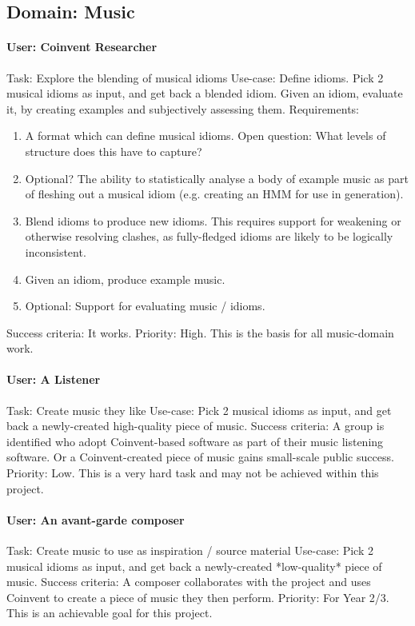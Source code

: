\documentclass[a4paper,twoside,11pt]{article}
\begin{document}
\begin{appendices}
\subsection{Domain: Music}

\paragraph{User: Coinvent Researcher}
Task: Explore the blending of musical idioms      
Use-case: Define idioms. Pick 2 musical idioms as input, and get back a blended idiom. Given an idiom, evaluate it, by creating examples and subjectively assessing them.   
Requirements: 
\begin{enumerate}
\item A format which can define musical idioms. Open question: What levels of structure does this have to capture?
\item Optional? The ability to statistically analyse a body of example music as part of fleshing out a musical idiom (e.g. creating an HMM for use in generation).
\item Blend idioms to produce new idioms. This requires support for weakening or otherwise resolving clashes, as fully-fledged idioms are likely to be logically inconsistent.
\item Given an idiom, produce example music.
\item Optional: Support for evaluating music / idioms.
\end{enumerate}
Success criteria: It works.       
Priority: High. This is the basis for all music-domain work.
 
\paragraph{User: A Listener}
Task: Create music they like      
Use-case: Pick 2 musical idioms as input, and get back a newly-created high-quality piece of music.
Success criteria: A group is identified who adopt Coinvent-based software as part of their music listening software. Or a Coinvent-created piece of music gains small-scale public success.   
Priority: Low. This is a very hard task and may not be achieved within this project.
 
\paragraph{User: An avant-garde composer}
Task: Create music to use as inspiration / source material   
Use-case: Pick 2 musical idioms as input, and get back a newly-created *low-quality* piece of music.   
Success criteria: A composer collaborates with the project and uses Coinvent to create a piece of music they then perform.      
Priority: For Year 2/3. This is an achievable goal for this project.



\end{appendices}
\end{document}
